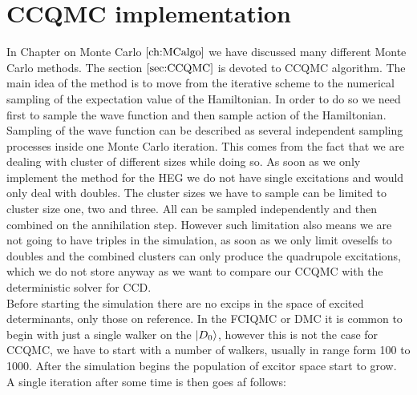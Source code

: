 \documentclass[twoside,english]{uiofysmaster}
\theoremstyle{definition}
\begin{document}
\section{CCQMC implementation}
In Chapter on Monte Carlo $\ref{ch:MCalgo}$ we have discussed many different Monte Carlo methods. The section $\ref{sec:CCQMC}$ is devoted to CCQMC algorithm. The main idea of the method is to move from the iterative scheme to the numerical sampling of the expectation value of the Hamiltonian. In order to do so we need first to sample the wave function and then sample action of the Hamiltonian. Sampling of the wave function can be described as several independent sampling processes inside one Monte Carlo iteration. This comes from the fact that we are dealing with cluster of different sizes while doing so. As soon as we only implement the method for the HEG we do not have single excitations and would only deal with doubles. The cluster sizes we have to sample can be limited to cluster size one, two and three. All can be sampled independently and then combined on the annihilation step. However such limitation also means we are not going to have triples in the simulation, as soon as we only limit oveselfs to doubles and the combined clusters can only produce the quadrupole excitations, which we do not store anyway as we want to compare our CCQMC with the deterministic solver for CCD. \\
Before starting the simulation there are no excips in the space of excited determinants, only those on reference. In the FCIQMC or DMC it is common to begin with just a single walker on the $\ket{D_0}$, however this is not the case for CCQMC, we have to start with a number of walkers, usually in range form 100 to 1000. After the simulation begins the population of excitor space start to grow. \\ 
A single iteration after some time is then goes af follows:
\end{document}
